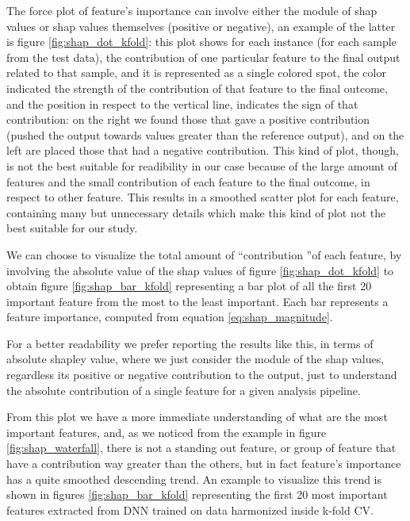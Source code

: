 \documentclass[10pt]{report}
\begin{document}
The force plot of feature's importance can involve either the module of shap values or shap values themselves (positive or negative), an example of the latter is figure \ref{fig:shap_dot_kfold}: this plot shows for each instance (for each sample from the test data), the contribution of one particular feature to the final output related to that sample, and it is represented as a single colored spot, the color indicated the strength of the contribution of that feature to the final outcome, and the position in respect to the vertical line, indicates the sign of that contribution: on the right we found those that gave a positive contribution (pushed the output towards values greater than the reference output), and on the left are placed those that had a negative contribution.
This kind of plot, though, is not the best suitable for readibility in our case because of the large amount of features and the small contribution of each feature to the final outcome, in respect to other feature.
This results in a smoothed scatter plot for each feature, containing many but unnecessary details which make this kind of plot not the best suitable for our study.

We can choose to visualize the total amount of \textquotedblleft contribution \textquotedblright of each feature, by involving the absolute value of the shap values of figure \ref{fig:shap_dot_kfold} to obtain figure \ref{fig:shap_bar_kfold} representing a bar plot of all the first 20 important feature from the most to the least important.
Each bar represents a feature importance, computed from equation \ref{eq:shap_magnitude}.

For a better readability we prefer reporting the results like this, in terms of absolute shapley value, where we just consider the module of the shap values, regardless its positive or negative contribution to the output, just to understand the absolute contribution of a single feature for a given analysis pipeline.

From this plot we have a more immediate understanding of what are the most important features, and, as we noticed from the example in figure \ref{fig:shap_waterfall}, there is not a standing out feature, or group of feature that have a contribution way greater than the others, but in fact feature's importance has a quite smoothed descending trend.
An example to visualize this trend is shown in figures \ref{fig:shap_bar_kfold} representing the first 20 most important features extracted from DNN trained on data harmonized inside k-fold CV.
\end{document}
